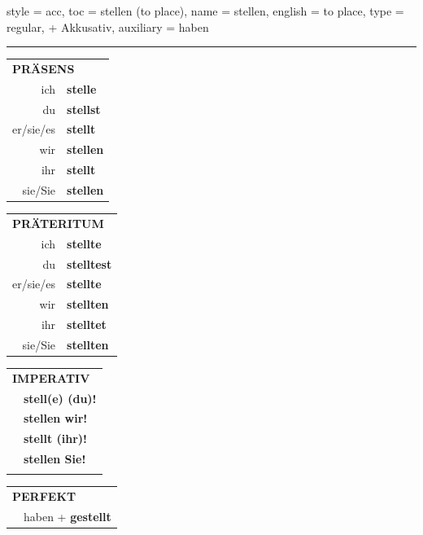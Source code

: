 \begin{verbentry}{
  style = {acc},
  toc = {stellen (to place)},
  name = {stellen},
  english = {to place},
  type = {regular, + Akkusativ},
  auxiliary = {haben}
}
 
    
     \vspace{5pt}

    \hrule
    
    \vspace{5pt}

  \begin{tabular}{rl}
     \multicolumn{2}{l}{\textbf{PRÄSENS} }\\
    ich & \textbf{stelle}\\
    du & \textbf{stellst}\\
    er/sie/es & \textbf{stellt}\\
    wir & \textbf{stellen}\\
    ihr & \textbf{stellt}\\
    sie/Sie & \textbf{stellen}\\
  \end{tabular}
  \hfill
     \begin{tabular}{rl}
    \multicolumn{2}{l}{\textbf{PRÄTERITUM} }\\
    ich & \textbf{stellte}\\
    du & \textbf{stelltest}\\
    er/sie/es & \textbf{stellte}\\
    wir & \textbf{stellten}\\
    ihr & \textbf{stelltet}\\
    sie/Sie & \textbf{stellten}\\
  \end{tabular}
  \hfill
  \begin{tabular}{rl}
     \multicolumn{2}{l}{\textbf{IMPERATIV} }\\
   & \textbf{stell(e) (du)!}\\
   & \textbf{stellen wir!}\\
   & \textbf{stellt (ihr)!}\\
   & \textbf{stellen Sie!}\\
   & \vspace{10pt}
  \end{tabular}

    \vspace{10pt}

 \begin{tabular}{rl}
     \multicolumn{2}{l}{\textbf{PERFEKT}}\\
   & haben + \textbf{gestellt}\\
  \end{tabular}
\hfill
   \begin{tabular}{rl}
   

\end{tabular}
\end{verbentry}
